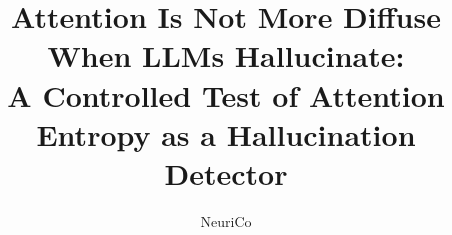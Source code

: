 \documentclass{article}
\title{Attention Is Not More Diffuse When LLMs Hallucinate:\\A Controlled Test of Attention Entropy as a Hallucination Detector}
\author{NeuriCo}
\begin{document}
\maketitle

\begin{abstract}

\end{abstract}










\appendix

\end{document}
